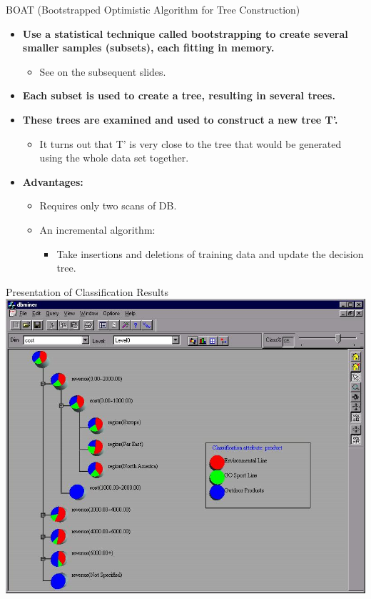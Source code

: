 \begin{frame}{BOAT (Bootstrapped Optimistic Algorithm for Tree Construction)}
  \begin{itemize}
  \item \textbf{Use a statistical technique called bootstrapping to create several smaller samples (subsets), each fitting in memory.}
    \begin{itemize}
    \item See on the subsequent slides.
    \end{itemize}
  \item \textbf{Each subset is used to create a tree, resulting in several trees.}
  \item \textbf{These trees are examined and used to construct a new tree T'.}
    \begin{itemize}
    \item It turns out that T' is very close to the tree that would be generated \\
      using the whole data set together.
    \end{itemize}
  \item \textbf{Advantages:}
    \begin{itemize}
    \item Requires only two scans of DB.
    \item An incremental algorithm:
      \begin{itemize}
      \item Take insertions and deletions of training data and update the decision tree.
      \end{itemize}
    \end{itemize}
  \end{itemize}
\end{frame}

\begin{frame}{Presentation of Classification Results}
  \centering
  \includegraphics[height=0.9\textheight]{img/classification1.jpeg}
\end{frame}

